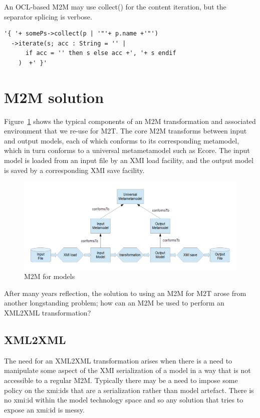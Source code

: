 \documentclass{llncs}
\begin{document}
An OCL-based M2M may use collect() for the content iteration, but the separator splicing is verbose.

\begin{verbatim}
'{ '+ somePs->collect(p | '"'+ p.name +'"')
  ->iterate(s; acc : String = '' |
      if acc = '' then s else acc +', '+ s endif
    )  +' }'
\end{verbatim}

\section{M2M solution}\label{M2M}

Figure~\ref{fig:ModelM2M} shows the typical components of an M2M transformation and associated environment that we re-use for M2T. The core M2M transforms between input and output models, each of which conforms to its corresponding metamodel, which in turn conforms to a universal metametamodel such as Ecore. The input model is loaded from an input file by an XMI load facility, and the output model is saved by a corresponding XMI save facility.

\begin{figure}
	\begin{center}
		\includegraphics[width=4.9in]{ModelM2M.png}
	\end{center}
	\caption{M2M for models}
	\label{fig:ModelM2M}
\end{figure}

After many years reflection, the solution to using an M2M for M2T arose from another longstanding problem; how can an M2M be used to perform an XML2XML transformation?

\subsection{XML2XML}\label{XML2XML}

The need for an XML2XML transformation arises when there is a need to manipulate some aspect of the XMI serialization of a model in a way that is not accessible to a regular M2M. Typically there may be a need to impose some policy on the xmi:ids that are a serialization rather than model artefact. There is no xmi:id within the model technology space and so any solution that tries to expose an xmi:id is messy.
\end{document}
